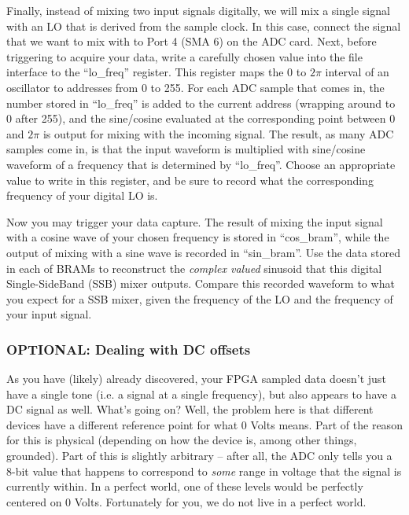 \documentclass[11pt]{article}
\begin{document}
Finally, instead of mixing two input signals digitally, we will mix a single signal with an LO that is
derived from the sample clock.  In this case, connect the signal that we want to mix with to Port 4 (SMA 6)
on the ADC card.  Next, before triggering to acquire your data, write a carefully chosen value
into the file interface to the ``lo\_freq'' register.  This register maps the 0 to $2\pi$ interval
of an oscillator to addresses from 0 to 255.  For each ADC sample that comes in, the number stored
in ``lo\_freq'' is added to the current address (wrapping around to 0 after 255), and the sine/cosine
evaluated at the corresponding point between 0 and $2\pi$ is output for mixing with the incoming signal.
The result, as many ADC samples come in, is that the input waveform is multiplied with sine/cosine waveform
of a frequency that is determined by ``lo\_freq''.  Choose an appropriate value to write in this register,
and be sure to record what the corresponding frequency of your digital LO is.

Now you may trigger your data capture.  The result of mixing the input signal with a cosine wave of your
chosen frequency is stored in ``cos\_bram'', while the output of mixing with a sine wave is recorded
in ``sin\_bram''.  Use the data stored in each of BRAMs to reconstruct the {\it complex valued} sinusoid
that this digital Single-SideBand (SSB) mixer outputs.  Compare this recorded waveform to what you
expect for a SSB mixer, given the frequency of the LO and the frequency of your input signal.

\subsubsection{OPTIONAL: Dealing with DC offsets}

As you have (likely) already discovered, your FPGA sampled data doesn't just have
a single tone (i.e. a signal at a single frequency), but also appears to have a DC signal as well.
What's going on? Well, the problem here is that different devices have a different reference point for what
0 Volts means. Part of the reason for this is physical (depending on how the device is, among other things,
 grounded). Part of this is slightly arbitrary -- after all, the ADC only tells you a 8-bit value that
happens to correspond to \emph{some} range in voltage that the signal is currently within. In a perfect world,
one of these levels would be perfectly centered on 0 Volts. Fortunately for you, we do not live in
a perfect world.
\end{document}

